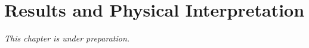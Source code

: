 
\chapter{Results and Physical Interpretation}
\label{ch:results}

\textit{This chapter is under preparation.}
